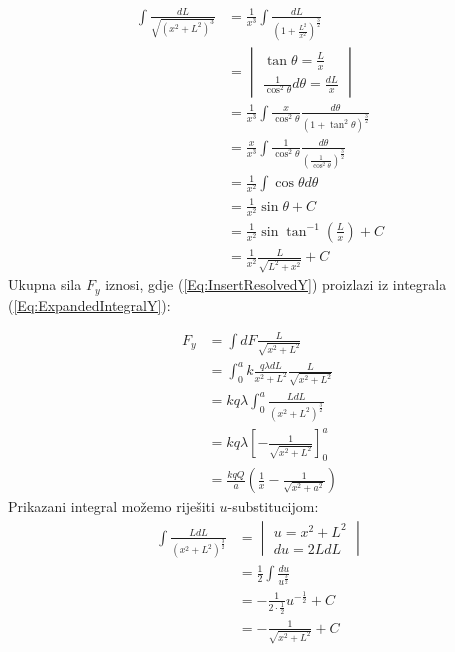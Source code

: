 \documentclass{article}
\let\oldref\ref
\renewcommand{\ref}[1]{(\oldref{#1})}
\begin{document}
\begin{align}
  \label{Eq:ExpandedIntegralX}
  \int\frac{dL}{\sqrt{(x^2+L^2)^3}}
   & = \frac{1}{x^3}\int\frac{dL}{\left(1+\frac{L^2}{x^2}\right)^\frac{3}{2}}                                 \\
   & = \begin{vmatrix}
         \tan\theta = \frac{L}{x} \\
         \frac{1}{\cos^2\theta}d\theta = \frac{dL}{x}
       \end{vmatrix}                                                            \\
   & = \frac{1}{x^3}\int\frac{x}{\cos^2\theta}\frac{d\theta}{\left(1+\tan^2\theta\right)^{\frac{3}{2}}}       \\
   & = \frac{x}{x^3}\int\frac{1}{\cos^2\theta}\frac{d\theta}{\left(\frac{1}{\cos^2\theta}\right)^\frac{3}{2}} \\
   & = \frac{1}{x^2}\int\cos\theta{d}\theta                                                                   \\
   & = \frac{1}{x^2}\sin\theta + C                                                                            \\
   & = \frac{1}{x^2}\sin\tan^{-1}\left(\frac{L}{x}\right) + C                                                 \\
   & = \frac{1}{x^2}\frac{L}{\sqrt{L^2+x^2}} + C
\end{align}
Ukupna sila $F_y$ iznosi, gdje \ref{Eq:InsertResolvedY} proizlazi iz integrala \ref{Eq:ExpandedIntegralY}:

\begin{align}
  F_y & = {\int}dF\frac{L}{\sqrt{x^2+L^2}}                                     \\
      & = \int_{0}^{a}k\frac{q{\lambda}dL}{x^2+L^2}\frac{L}{\sqrt{x^2+L^2}}    \\
      & = kq{\lambda}\int_{0}^{a}\frac{L dL}{\left(x^2+L^2\right)^\frac{3}{2}} \\
  \label{Eq:InsertResolvedY}
      & = kq{\lambda}\left[-\frac{1}{\sqrt{x^2+L^2}}\right]_{0}^{a}            \\
      & = \frac{kqQ}{a}\left(\frac{1}{x} - \frac{1}{\sqrt{x^2+a^2}}\right)
\end{align}
Prikazani integral možemo riješiti $u$-substitucijom:
\begin{align}
  \int\frac{L dL}{\left(x^2+L^2\right)^\frac{3}{2}}
  \label{Eq:ExpandedIntegralY}
   & = \begin{vmatrix}
         u = x^2+L^2 \\
         du = 2LdL
       \end{vmatrix}                                   \\
   & = \frac{1}{2}\int\frac{du}{u^\frac{3}{2}}          \\
   & = -\frac{1}{2\cdot\frac{1}{2}}u^{-\frac{1}{2}} + C \\
   & = -\frac{1}{\sqrt{x^2+L^2}} + C
\end{align}
\end{document}
